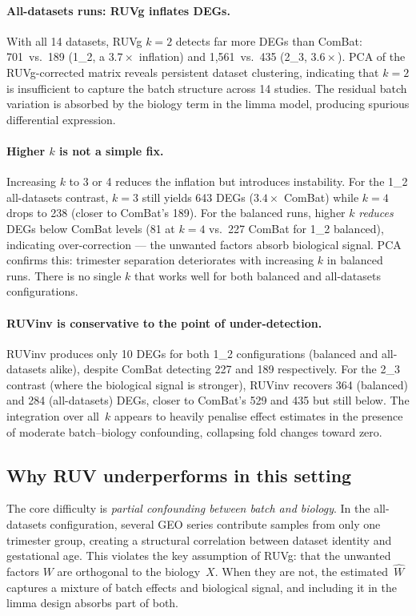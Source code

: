 \documentclass[11pt,a4paper]{article}
\begin{document}
\paragraph{All-datasets runs: RUVg inflates DEGs.}
With all 14 datasets, RUVg $k = 2$ detects far more DEGs than
ComBat: 701~vs.\ 189 (1\_2, a $3.7{\times}$ inflation) and
1{,}561~vs.\ 435 (2\_3, $3.6{\times}$).  PCA of the RUVg-corrected
matrix reveals persistent dataset clustering, indicating that $k = 2$
is insufficient to capture the batch structure across 14 studies.
The residual batch variation is absorbed by the biology term in the
limma model, producing spurious differential expression.

\paragraph{Higher $k$ is not a simple fix.}
Increasing $k$ to 3 or 4 reduces the inflation but introduces
instability.  For the 1\_2 all-datasets contrast, $k = 3$ still
yields 643 DEGs ($3.4{\times}$ ComBat) while $k = 4$ drops to 238
(closer to ComBat's 189).  For the balanced runs, higher $k$
\emph{reduces} DEGs below ComBat levels (81 at $k = 4$ vs.\ 227
ComBat for 1\_2 balanced), indicating over-correction --- the
unwanted factors absorb biological signal.  PCA confirms this:
trimester separation deteriorates with increasing $k$ in balanced
runs.  There is no single $k$ that works well for both balanced and
all-datasets configurations.

\paragraph{RUVinv is conservative to the point of under-detection.}
RUVinv produces only 10 DEGs for both 1\_2 configurations (balanced
and all-datasets alike), despite ComBat detecting 227 and 189
respectively.  For the 2\_3 contrast (where the biological signal is
stronger), RUVinv recovers 364 (balanced) and 284 (all-datasets)
DEGs, closer to ComBat's 529 and 435 but still below.  The
integration over all~$k$ appears to heavily penalise effect
estimates in the presence of moderate batch--biology confounding,
collapsing fold changes toward zero.

\subsection{Why RUV underperforms in this setting}

The core difficulty is \emph{partial confounding between batch and
biology}.  In the all-datasets configuration, several GEO series
contribute samples from only one trimester group, creating a
structural correlation between dataset identity and gestational age.
This violates the key assumption of RUVg: that the unwanted factors
$W$ are orthogonal to the biology~$X$.  When they are not, the
estimated~$\hat{W}$ captures a mixture of batch effects and
biological signal, and including it in the limma design absorbs part
of both.
\end{document}

